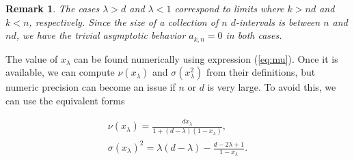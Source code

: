 \documentclass{article}
\newtheorem*{remark}{Remark}
\begin{document}
\begin{remark}
The cases $\lambda > d$ and $\lambda < 1$ correspond to limits where $k >
nd$ and $k < n$, respectively. Since the size of a collection of $n$
$d$-intervals is between $n$ and $nd$, we have the trivial asymptotic
behavior $a_{k,n} = 0$ in both cases.
\end{remark}


The value of $x_\lambda$ can be found numerically using expression
(\ref{eq:mu}).  Once it is available, we can compute $\nu(x_\lambda)$ and
$\sigma(x_\lambda^2)$ from their definitions, but numeric precision can
become an issue if $n$ or $d$ is very large. To avoid this, we can use the
equivalent forms


\begin{gather}
\label{eq:nu} %
\nu(x_\lambda) = \frac{dx_\lambda}{1+(d-\lambda)(1-x_\lambda)}, \\
\label{eq:sigma} %
\sigma(x_\lambda)^2 = \lambda(d-\lambda) -
  \frac{d-2\lambda+1}{1-x_\lambda}.
\end{gather}
\end{document}
